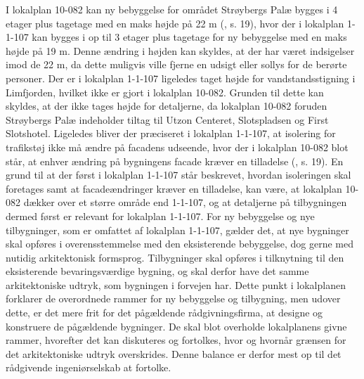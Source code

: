 I lokalplan 10-082 kan ny bebyggelse for området Strøybergs Palæ bygges i 4 etager plus tagetage med en maks højde på 22 m (\citep{gammellokalplan}, s. 19), hvor der i lokalplan 1-1-107 kan bygges i op til 3 etager plus tagetage for ny bebyggelse med en maks højde på 19 m. Denne ændring i højden kan skyldes, at der har været indsigelser imod de 22 m, da dette muligvis ville fjerne en udsigt eller sollys for de berørte personer. 
\newline \indent{     }  Der er i lokalplan 1-1-107 ligeledes taget højde for vandstandsstigning i Limfjorden, hvilket ikke er gjort i lokalplan 10-082. Grunden til dette kan skyldes, at der ikke tages højde for detaljerne, da lokalplan 10-082 foruden Strøybergs Palæ indeholder tiltag til Utzon Centeret, Slotspladsen og First Slotshotel.
\newline \indent{     }  Ligeledes bliver der præciseret i lokalplan 1-1-107, at isolering for trafikstøj ikke må ændre på facadens udseende, hvor der i lokalplan 10-082 blot står, at enhver ændring på bygningens facade kræver en tilladelse (\citep{gammellokalplan}, s. 19). En grund til at der først i lokalplan 1-1-107 står beskrevet, hvordan isoleringen skal foretages samt at facadeændringer kræver en tilladelse, kan være, at lokalplan 10-082 dækker over et større område end 1-1-107, og at detaljerne på tilbygningen dermed først er relevant for lokalplan 1-1-107. 
\newline \indent{     }  For ny bebyggelse og nye tilbygninger, som er omfattet af lokalplan 1-1-107, gælder det, at nye bygninger skal opføres i overensstemmelse med den eksisterende bebyggelse, dog gerne med nutidig arkitektonisk formsprog. Tilbygninger skal opføres i tilknytning til den eksisterende bevaringsværdige bygning, og skal derfor have det samme arkitektoniske udtryk, som bygningen i forvejen har. 
\newline \indent{     }  Dette punkt i lokalplanen forklarer de overordnede rammer for ny bebyggelse og tilbygning, men udover dette, er det mere frit for det pågældende rådgivningsfirma, at designe og konstruere de pågældende bygninger. De skal blot overholde lokalplanens givne rammer, hvorefter det kan diskuteres og fortolkes, hvor og hvornår grænsen for det arkitektoniske udtryk overskrides. Denne balance er derfor mest op til det rådgivende ingeniørselskab at fortolke.

